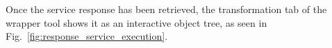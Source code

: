 % 
% 





Once the service response has been retrieved, the transformation tab of the wrapper tool shows it as an interactive object tree, as seen in Fig.~\ref{fig:response_service_execution}. 

